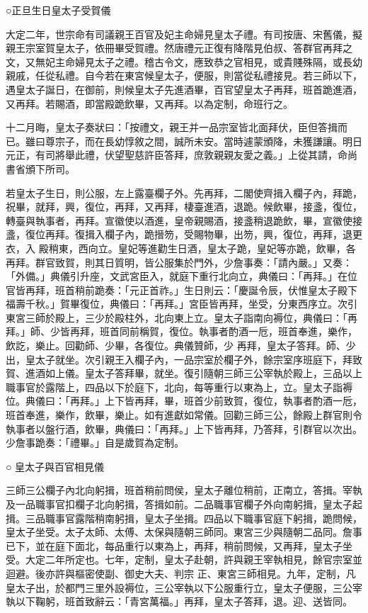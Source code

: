 \begin{pinyinscope}
 ○正旦生日皇太子受賀儀



 大定二年，世宗命有司議親王百官及妃主命婦見皇太子禮。有司按唐、宋舊儀，擬親王宗室賀皇太子，依冊畢受賀禮。然唐禮元正復有降階見伯叔、答群官再拜之文，又無妃主命婦見太子之禮。稽古令文，應致恭之官相見，或貴賤殊隔，或長幼親戚，任從私禮。自今若在東宮候皇太子，便服，則當從私禮接見。若三師以下，遇皇太子誕日，在御前，則候皇太子先進酒畢，百官望皇太子再拜，班首跪進酒，又再拜。若賜酒，即當殿跪飲畢，又再拜。以為定制，命班行之。



 十二月晦，皇太子奏狀曰：「按禮文，親王并一品宗室皆北面拜伏，臣但答揖而已。雖曰尊宗子，而在長幼惇敘之間，誠所未安。當時遽蒙頒降，未獲謙讓。明日元正，有司將舉此禮，伏望聖慈許臣答拜，庶敦親親友愛之義。」上從其請，命尚書省頒下所司。



 若皇太子生日，則公服，左上露臺欄子外。先再拜，二閣使齊揖入欄子內，拜跪，祝畢，就拜，興，復位，再拜，又再拜，棲臺進酒，退跪。候飲畢，接盞，復位，轉臺與執事者，再拜。宣徽使以酒進，皇帝親賜酒，接盞稍退跪飲，畢，宣徽使接盞，復位再拜。復揖入欄子內，跪搢笏，受賜物畢，出笏，興，復位，再拜，退更衣，入
 殿稍東，西向立。皇妃等進勸生日酒，皇太子跪，皇妃等亦跪，飲畢，各再拜。群官致賀，則其日質明，皆公服集於門外，少詹事奏：「請內嚴。」又奏：「外備。」典儀引升座，文武宮臣入，就庭下重行北向立，典儀曰：「再拜。」在位官皆再拜，班首稍前跪奏：「元正首祚。」生日則云：「慶誕令辰，伏惟皇太子殿下福壽千秋。」賀畢復位，典儀曰：「再拜。」宮臣皆再拜，坐受，分東西序立。次引東宮三師於殿上，三少於殿柱外，北向東上立。皇太子詣南向褥位，典儀曰：「再拜。」師、少皆再拜，班首同前稱賀，復位。執事者酌酒一卮，班首奉進，樂作，飲訖，樂止。回勸師、少畢，各復位。典儀贊師，少
 再拜，皇太子答拜。師、少出，皇太子就坐。次引親王入欄子內，一品宗室於欄子外，餘宗室序班庭下，拜致賀、進酒如上儀。皇太子答拜畢，就坐。復引隨朝三師三公宰執於殿上，三品以上職事官於露階上，四品以下於庭下，北向，每等重行以東為上，立。皇太子詣褥位。典儀曰：「再拜。」上下皆再拜，畢，班首少前致賀，復位，執事者酌酒一卮，班首奉進，樂作，飲畢，樂止。如有進獻如常儀。回勸三師三公，餘殿上群官則令執事者以盤行酒，飲畢，典儀曰：「再拜。」上下皆再拜，乃答拜，引群官以次出。少詹事跪奏：「禮畢。」自是歲賀為定制。



 ○
 皇太子與百官相見儀



 三師三公欄子內北向躬揖，班首稍前問侯，皇太子離位稍前，正南立，答揖。宰執及一品職事官扣欄子北向躬揖，答揖如前。二品職事官欄子外向南躬揖，皇太子起揖。三品職事官露階稍南躬揖，皇太子坐揖。四品以下職事官庭下躬揖，跪問候，皇太子坐受。太子太師、太傅、太保與隨朝三師同。東宮三少與隨朝二品同。詹事已下，並在庭下面北，每品重行以東為上，再拜，稍前問候，又再拜，皇太子坐受。大定二年所定也。七年，定制，皇太子赴朝，許與親王宰執相見，餘官宗室並迴避。後亦許與樞密使副、御史大夫、判宗
 正、東宮三師相見。九年，定制，凡皇太子出，於都門三里外設褥位，三公宰執以下公服重行立，皇太子便服，三公宰執以下鞠躬，班首致辭云：「青宮萬福。」再拜，皇太子答拜，退。迎、送皆同。



\end{pinyinscope}